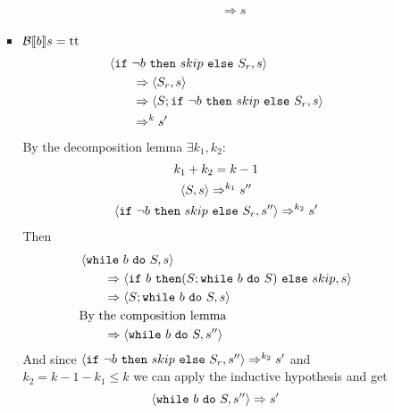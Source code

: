 \begin{exercise}
\begin{itemize}
\begin{itemize}
\begin{itemize}
\begin{gather*}
\begin{align*}
                            \\&\qquad\Rightarrow s
                        \end{align*}
                    \end{gather*}
                    \item $\mathcal{B} \llbracket  b \rrbracket s = \text{tt}$
                    \begin{align*}
                        &\instr{\texttt{if}\ \neg b\ \texttt{then}\ skip\ \texttt{else}\ S_r}{s}
                        \\&\qquad\Rightarrow \instr{S_r}{s}
                        \\&\qquad\Rightarrow \instr{S; \texttt{if}\ \neg b\ \texttt{then}\ skip\ \texttt{else}\ S_r}{s}
                        \\&\qquad\Rightarrow^k s'
                    \end{align*}
                    By the decomposition lemma $\exists k_1, k_2 :$
                    \begin{gather*}
                        k_1 + k_2 = k - 1 \\
                        \instr{S}{s} \Rightarrow^{k_1} s'' \\
                        \instr{\texttt{if}\ \neg b\ \texttt{then}\ skip\ \texttt{else}\ S_r}{s''} \Rightarrow^{k_2} s'
                    \end{gather*}
                    Then
                    \begin{align*}
                        &\instr{\texttt{while}\ b\ \texttt{do}\ S}{s}
                        \\&\qquad\Rightarrow \instr{\texttt{if}\ b\ \texttt{then} (S; \texttt{while}\ b\ \texttt{do}\ S)\ \texttt{else}\ skip}{s}
                        \\&\qquad\Rightarrow \instr{S; \texttt{while}\ b\ \texttt{do}\ S}{s}
                        \\&\text{By the composition lemma}
                        \\&\qquad\Rightarrow \instr{\texttt{while}\ b\ \texttt{do}\ S}{s''}
                    \end{align*}
                    And since $\instr{\texttt{if}\ \neg b\ \texttt{then}\ skip\ \texttt{else}\ S_r}{s''} \Rightarrow^{k_2} s'$ and $k_2 = k - 1 - k_1 \leq k$  we can apply the inductive hypothesis and get
                    \[ \left<\texttt{while}\ b\ \texttt{do}\ S, s''\right> \Rightarrow s' \]
                \end{itemize}

\end{itemize}
\end{itemize}
\end{exercise}
